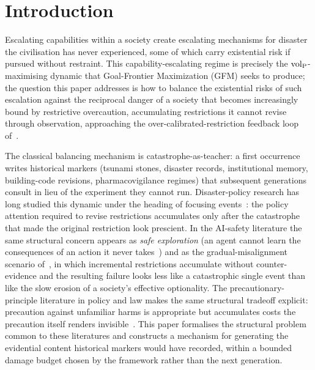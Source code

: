 \section{Introduction}
\label{sec:introduction}

Escalating capabilities within a society create escalating
mechanisms for disaster the civilisation has never experienced,
some of which carry existential risk if pursued without restraint.
This capability-escalating regime is precisely the
${\operatorname{vol}_{\mathrm{P}}}$-maximising dynamic that Goal-Frontier Maximization (GFM)
seeks to produce; the question this paper addresses is how to
balance the existential risks of such escalation against the
reciprocal danger of a
society that becomes increasingly bound by restrictive
overcaution, accumulating restrictions it cannot revise through
observation, approaching the over-calibrated-restriction feedback loop
of~\citep[Loop~3]{lasser2026phase}.

The classical balancing mechanism is catastrophe-as-teacher: a
first occurrence writes historical markers (tsunami stones,
disaster records, institutional memory, building-code revisions,
pharmacovigilance regimes) that subsequent generations consult in
lieu of the experiment they cannot run.  Disaster-policy research
has long studied this dynamic under the heading of focusing
events~\citep{birkland1997after}: the policy attention required to
revise restrictions accumulates only after the catastrophe that
made the original restriction look prescient.  In the AI-safety
literature the same structural concern appears as
\emph{safe exploration} (an agent cannot learn the consequences
of an action it never takes~\citep{amodei2016concrete}) and as
the gradual-misalignment scenario of~\citet{christiano2019what},
in which incremental restrictions accumulate without
counter-evidence and the resulting failure looks less like a
catastrophic single event than like the slow erosion of a
society's effective optionality.  The precautionary-principle
literature in policy and law makes the same structural
tradeoff explicit: precaution against unfamiliar harms is
appropriate but accumulates costs the precaution itself renders
invisible~\citep{sunstein2005laws}.  This paper formalises the
structural problem common to these literatures and constructs a
mechanism for generating the evidential content historical
markers would have recorded, within a bounded damage budget
chosen by the framework rather than the next generation.

